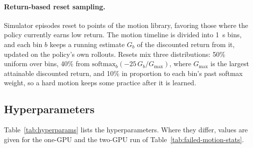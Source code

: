 \paragraph{Return-based reset sampling.}
\label{app:reset}
Simulator episodes reset to points of the motion library, favoring those where the policy currently earns low return. The motion timeline is divided into \qty{1}{\second} bins, and each bin $b$ keeps a running estimate $G_b$ of the discounted return from it, updated on the policy's own rollouts. Resets mix three distributions: 50\% uniform over bins, 40\% from $\mathrm{softmax}_b(-25\,G_b/G_{\max})$, where $G_{\max}$ is the largest attainable discounted return, and 10\% in proportion to each bin's past softmax weight, so a hard motion keeps some practice after it is learned.

\subsection{Hyperparameters}

Table~\ref{tab:hyperparams} lists the hyperparameters. Where they differ, values are given for the one-GPU and the two-GPU run of Table~\ref{tab:failed-motion-stats}.

